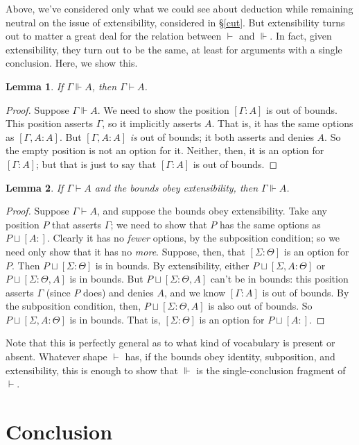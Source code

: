 \documentclass{article}
\newcommand{\G}{\ensuremath{\Gamma}}
\newcommand{\Sig}{\ensuremath{\Sigma}}
\newcommand{\pcup}{\ensuremath{\sqcup}}
\newcommand{\pos}[2]{\ensuremath{[#1:#2]}}
\newcommand{\cns}{\vdash}
\newcommand{\ded}{\Vdash}
\newtheorem{lem}{Lemma}
\begin{document}
Above, we've considered only what we could see about deduction while remaining neutral on the issue of extensibility, considered in \S\ref{cut}.
But extensibility turns out to matter a great deal for the relation between $\cns$ and $\ded$.
In fact, given extensibility, they turn out to be the same, at least for arguments with a single conclusion. 
Here, we show this.

\begin{lem}
If $\G \ded A$, then $\G \cns A$.
\end{lem}

\begin{proof}
Suppose $\G \ded A$. 
We need to show the position $\pos{\G}{A}$ is out of bounds.
This position asserts $\G$, so it implicitly asserts $A$. 
That is, it has the same options as $\pos{\G, A}{A}$.
But $\pos{\G, A}{A}$ {\em is} out of bounds; it both asserts and denies $A$.
So the empty position is not an option for it.
Neither, then, it is an option for $\pos{\G}{A}$; but that is just to say that $\pos{\G}{A}$ is out of bounds.
\end{proof}

\begin{lem}
If $\G \cns A$ and the bounds obey extensibility, then $\G \ded A$.
\end{lem}

\begin{proof}
Suppose $\G \cns A$, and suppose the bounds obey extensibility.
Take any position $P$ that asserts $\G$; we need to show that $P$ has the same options as $P \pcup \pos{A}{}$.
Clearly it has no {\em fewer} options, by the subposition condition; so we need only show that it has no {\em more}.
Suppose, then, that $\pos{\Sig}{\Theta}$ is an option for $P$.
Then $P \pcup \pos{\Sig}{\Theta}$ is in bounds.
By extensibility, either $P \pcup \pos{\Sig, A}{\Theta}$ or $P \pcup \pos{\Sig}{\Theta, A}$ is in bounds.
But $P \pcup \pos{\Sig}{\Theta, A}$ can't be in bounds: this position asserts $\G$ (since $P$ does) and denies $A$, and we know $\pos{\G}{A}$ is out of bounds.
By the subposition condition, then, $P \pcup \pos{\Sig}{\Theta, A}$ is also out of bounds.
So $P \pcup \pos{\Sig, A}{\Theta}$ is in bounds.
That is, $\pos{\Sig}{\Theta}$ is an option for $P \pcup \pos{A}{}$.
\end{proof}

Note that this is perfectly general as to what kind of vocabulary is present or absent.
Whatever shape $\cns$ has, if the bounds obey identity, subposition, and extensibility, this is enough to show that $\ded$ is the single-conclusion fragment of $\cns$.



\section{Conclusion}






\end{document}
